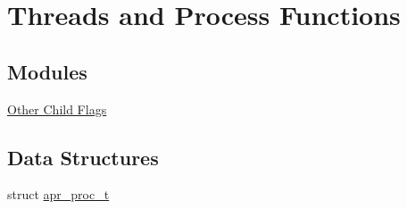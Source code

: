 \hypertarget{group__apr__thread__proc}{}\section{Threads and Process Functions}
\label{group__apr__thread__proc}
\subsection*{Modules}
\begin{DoxyCompactItemize}
\item 
\hyperlink{group___a_p_r___o_c}{Other Child Flags}
\end{DoxyCompactItemize}
\subsection*{Data Structures}
\begin{DoxyCompactItemize}
\item 
struct \hyperlink{structapr__proc__t}{apr\+\_\+proc\+\_\+t}
\end{DoxyCompactItemize}
